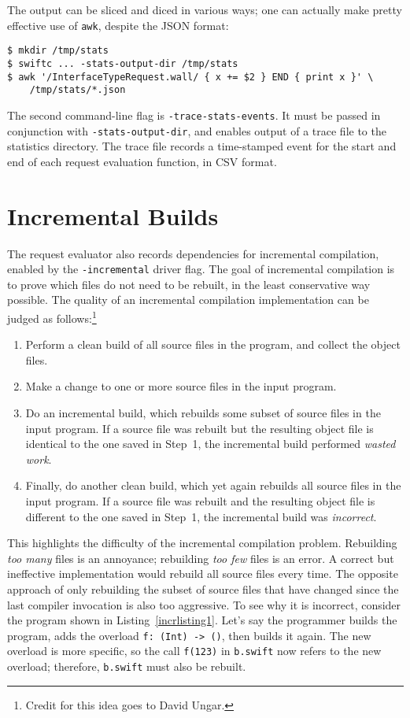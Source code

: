 \documentclass[../generics]{subfiles}
\begin{document}
The output can be sliced and diced in various ways; one can actually make pretty effective use of \texttt{awk}, despite the JSON format:
\begin{Verbatim}
$ mkdir /tmp/stats
$ swiftc ... -stats-output-dir /tmp/stats
$ awk '/InterfaceTypeRequest.wall/ { x += $2 } END { print x }' \
    /tmp/stats/*.json
\end{Verbatim}
The second command-line flag is \texttt{-trace-stats-events}. It must be passed in conjunction with \texttt{-stats-output-dir}, and enables output of a trace file to the statistics directory. The trace file records a time-stamped event for the start and end of each request evaluation function, in CSV format.
\IndexFlag{stats-output-dir}

\section{Incremental Builds}\label{incremental builds}
The request evaluator also records dependencies for incremental compilation, enabled by the \verb|-incremental| driver flag. The goal of incremental compilation is to prove which files do not need to be rebuilt, in the least conservative way possible. The quality of an incremental compilation implementation can be judged as follows:\footnote{Credit for this idea goes to David Ungar.}
\begin{enumerate}
\item Perform a clean build of all source files in the program, and collect the object files.
\item Make a change to one or more source files in the input program.
\item Do an incremental build, which rebuilds some subset of source files in the input program. If a source file was rebuilt but the resulting object file is identical to the one saved in Step~1, the incremental build performed \emph{wasted work}.
\item Finally, do another clean build, which yet again rebuilds all source files in the input program. If a source file was rebuilt and the resulting object file is different to the one saved in Step~1, the incremental build was \emph{incorrect}.
\end{enumerate}
This highlights the difficulty of the incremental compilation problem. Rebuilding \emph{too many} files is an annoyance; rebuilding \emph{too few} files is an error. A correct but ineffective implementation would rebuild all source files every time. The opposite approach of only rebuilding the subset of source files that have changed since the last compiler invocation is also too aggressive. To see why it is incorrect, consider the program shown in Listing~\ref{incrlisting1}. Let's say the programmer builds the program, adds the overload \verb|f: (Int) -> ()|, then builds it again. The new overload is more specific, so the call \texttt{f(123)} in \texttt{b.swift} now refers to the new overload; therefore, \texttt{b.swift} must also be rebuilt.
\end{document}
